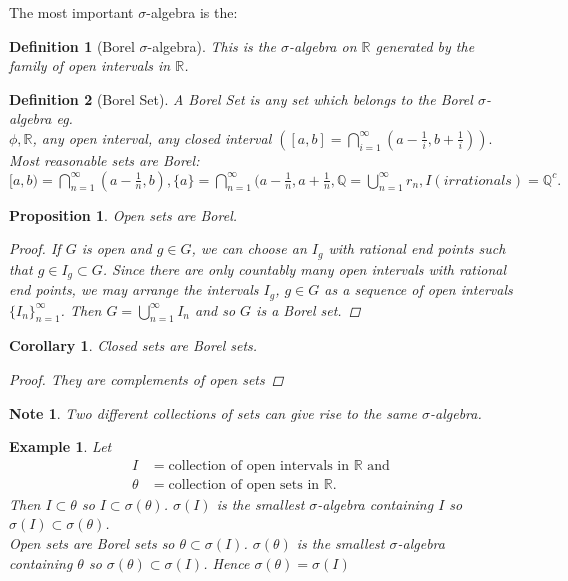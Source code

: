 \documentclass[12pt]{article}
\def\QQ{\mathbb{Q}}
\def\RR{\mathbb{R}}
\newtheorem{definition}{Definition}
\newtheorem{example}{Example}
\newtheorem{proposition}{Proposition}
\newtheorem*{note}{Note}
\newtheorem{corollary}{Corollary}
\begin{document}
The most important $\sigma$-algebra is the:

\begin{definition}[Borel $\sigma$-algebra]
This is the $\sigma$-algebra on $\RR$ generated by the family of open intervals in $\RR$.
\end{definition}

\begin{definition}[Borel Set]
A Borel Set is any set which belongs to the Borel $\sigma$-algebra eg.\\ $\phi, \RR$, any open interval, any closed interval $([a,b]=\bigcap_{i=1}^{\infty}(a - \frac{1}{i}, b + \frac{1}{i})).$\\ Most reasonable sets are Borel:\\
\([a,b)=\bigcap_{n=1}^{\infty}(a - \frac{1}{n}, b),  \{a\}=\bigcap_{n=1}^{\infty}(a - \frac{1}{n}, a + \frac{1}{n},   \QQ=\bigcup_{n=1}^{\infty}r_n,  I(irrationals)=\QQ^{c}.\)
\end{definition}

\begin{proposition} \label{P:OpenSetsBorel}
	Open sets are Borel.
	\begin{proof}
		If $G$ is open and $g \in G$, we can choose an $I_g$ with rational end points such that $g \in I_g \subset G$.  Since there are only countably many open intervals with rational end points, we may arrange the intervals $I_g$, $g \in G$ as a sequence of open intervals $\{I_n\}_{n=1}^\infty$.  Then $G = \bigcup_{n=1}^\infty I_n$ and so $G$ is a Borel set.
	\end{proof}
\end{proposition}

\begin{corollary} \label{C:ClosedSetsBorel}
	Closed sets are Borel sets.
	\begin{proof}
		They are complements of open sets
	\end{proof}
\end{corollary}

\begin{note}
	Two different collections of sets can give rise to the same $\sigma$-algebra.
\end{note}

\begin{example}
	Let
	\begin{align*}
		I &= \text{collection of open intervals in } \mathbb{R} \text{ and} \\
		\theta &= \text{collection of open sets in } \mathbb{R}.
	\end{align*}
	Then $I \subset \theta$ so $I \subset \sigma(\theta)$.  $\sigma(I)$ is the smallest $\sigma$-algebra containing $I$ so $\sigma(I) \subset \sigma(\theta)$.\\
	Open sets are Borel sets so $\theta \subset \sigma(I)$.  $\sigma(\theta)$ is the smallest $\sigma$-algebra containing $\theta$ so $\sigma(\theta) \subset \sigma(I)$. Hence $\sigma(\theta) = \sigma(I)$
\end{example}
\end{document}

